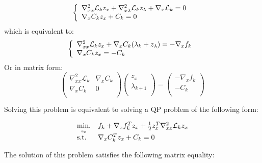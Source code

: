 \begin{equation}
  \label{KKT_1st_order}
  \left\{
\begin{array}{l}
  \nabla_{xx}^2\mathcal{L}_k z_x + \nabla_{x\lambda}^2\mathcal{L}_k z_\lambda + \nabla_x\mathcal{L}_k  = 0\\
  \nabla_x C_k z_x + C_k = 0\\
\end{array}
\right. \\
\end{equation}
which is equivalent to:
\begin{equation}
  \left\{
\begin{array}{l}
  \nabla_{xx}^2\mathcal{L}_k z_x + \nabla_{x}C_k (\lambda_k + z_\lambda) = - \nabla_{x}f_k\\
  \nabla_x C_k z_x = - C_k \\
\end{array}
\right. \\
\end{equation}
Or in matrix form:
\begin{equation}
  \begin{pmatrix}
      \nabla_{xx}^2\mathcal{L}_k & \nabla_x C_k\\
      \nabla_x C_k & 0\\
  \end{pmatrix}
  \begin{pmatrix}
      z_x\\
      \lambda_{k+1}\\
  \end{pmatrix}
  =
  \begin{pmatrix}
      -\nabla_{x}f_k\\
      -C_k\\
  \end{pmatrix}
\end{equation}

Solving this problem is equivalent to solving a QP problem of the following form:

\begin{equation}
  \begin{array}{ll}
    \operatorname*{min.}\limits_{z_x} &f_k + \nabla_x f_k ^T z_x + \frac{1}{2} z_x^T\nabla_{xx}^2\mathcal{L}_k z_x \\
    \text{s.t.} & \nabla_x C_k^T z_x + C_k = 0\\
  \end{array}
\end{equation}

The solution of this problem satisfies the following matrix equality:

